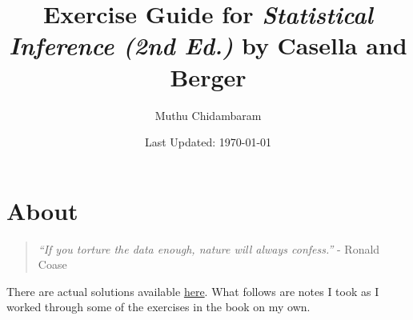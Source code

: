 \documentclass{article}
\begin{document}
\title{Exercise Guide for \textit{Statistical Inference (2nd Ed.)} by Casella and Berger}
\author{Muthu Chidambaram}
\date{Last Updated: \today}

\maketitle

\tableofcontents
\newpage 

\section*{About}

\begin{quote}
        \textit{``If you torture the data enough, nature will always confess.''} - Ronald Coase
\end{quote}

There are actual solutions available
\href{http://exampleproblems.com/Solutions-Casella-Berger.pdf}{here}. What follows are notes I took as
I worked through some of the exercises in the book on my own. 



\end{document}
